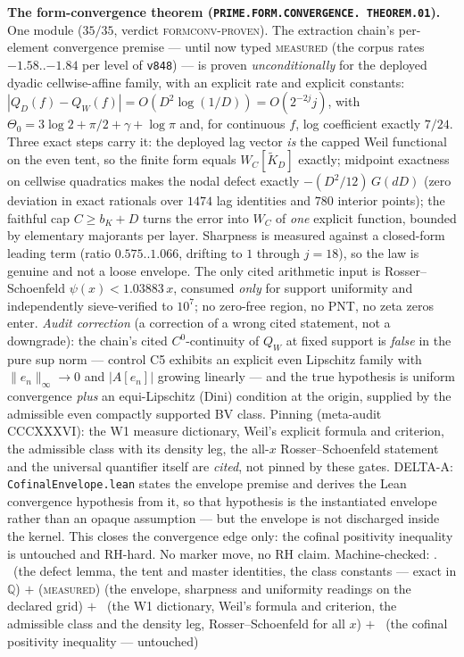 \documentclass[11pt,a4paper]{article}
\theoremstyle{definition}
\begin{document}
\par\smallskip\noindent\textbf{The form-convergence theorem
(\texttt{PRIME.FORM.\allowbreak CONVERGENCE.\allowbreak
THEOREM.01}).}
One module ($35/35$, verdict \textsc{formconv-proven}).  The
extraction chain's per-element convergence premise --- until now
typed \textsc{measured} (the corpus rates $-1.58$..$-1.84$ per
level of \texttt{v848}) --- is proven \emph{unconditionally} for
the deployed dyadic cellwise-affine family, with an explicit
rate and explicit constants:
$|Q_D(f) - Q_W(f)| = O(D^2 \log(1/D)) = O(2^{-2j} j)$, with
$\Theta_0 = 3\log 2 + \pi/2 + \gamma + \log \pi$ and, for
continuous $f$, log coefficient exactly $7/24$.  Three exact
steps carry it: the deployed lag vector \emph{is} the capped
Weil functional on the even tent, so the finite form equals
$W_C[\widetilde{K}_D]$ exactly; midpoint exactness on cellwise
quadratics makes the nodal defect exactly $-(D^2/12)\,G(dD)$
(zero deviation in exact rationals over $1474$ lag identities
and $780$ interior points); the faithful cap $C \ge b_K + D$
turns the error into $W_C$ of \emph{one} explicit function,
bounded by elementary majorants per layer.  Sharpness is
measured against a closed-form leading term (ratio
$0.575$..$1.066$, drifting to $1$ through $j = 18$), so the law
is genuine and not a loose envelope.  The only cited arithmetic
input is Rosser--Schoenfeld $\psi(x) < 1.03883\,x$, consumed
\emph{only} for support uniformity and independently
sieve-verified to $10^7$; no zero-free region, no PNT, no zeta
zeros enter.  \emph{Audit correction} (a correction of a wrong
cited statement, not a downgrade): the chain's cited
$C^0$-continuity of $Q_W$ at fixed support is \emph{false} in
the pure sup norm --- control C5 exhibits an explicit even
Lipschitz family with $\|e_n\|_\infty \to 0$ and $|A[e_n]|$
growing linearly --- and the true hypothesis is uniform
convergence \emph{plus} an equi-Lipschitz (Dini) condition at
the origin, supplied by the admissible even compactly supported
BV class.  Pinning (meta-audit CCCXXXVI): the W1 measure
dictionary, Weil's explicit formula and criterion, the
admissible class with its density leg, the all-$x$
Rosser--Schoenfeld statement and the universal quantifier
itself are \emph{cited}, not pinned by these gates.  DELTA-A:
\texttt{CofinalEnvelope.lean} states the envelope premise and
derives the Lean convergence hypothesis from it, so that
hypothesis is the instantiated envelope rather than an opaque
assumption --- but the envelope is not discharged inside the
kernel.  This closes the convergence edge only: the cofinal
positivity inequality is untouched and RH-hard.  No marker
move, no RH claim.
Machine-checked: .
\mE\ (the defect lemma, the tent and master identities, the
class constants --- exact in $\mathbb{Q}$) $+$
(\textsc{measured}) (the envelope, sharpness and uniformity
readings on the declared grid) $+$ \mC\ (the W1 dictionary,
Weil's formula and criterion, the admissible class and the
density leg, Rosser--Schoenfeld for all $x$) $+$ \mO\ (the
cofinal positivity inequality --- untouched)
\par\smallskip
\end{document}
